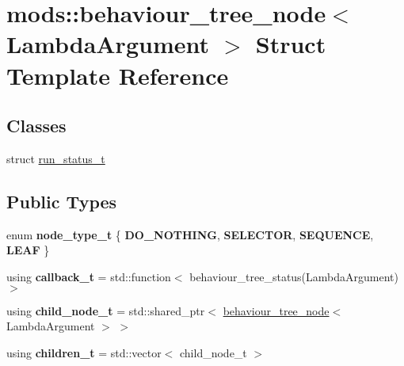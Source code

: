 \hypertarget{structmods_1_1behaviour__tree__node}{}\section{mods\+:\+:behaviour\+\_\+tree\+\_\+node$<$ Lambda\+Argument $>$ Struct Template Reference}
\label{structmods_1_1behaviour__tree__node}
\subsection*{Classes}
\begin{DoxyCompactItemize}
\item 
struct \hyperlink{structmods_1_1behaviour__tree__node_1_1run__status__t}{run\+\_\+status\+\_\+t}
\end{DoxyCompactItemize}
\subsection*{Public Types}
\begin{DoxyCompactItemize}
\item 
\mbox{\label{structmods_1_1behaviour__tree__node_a6d55cd288e1de6615791fc2fd2b7886f}} 
enum {\bfseries node\+\_\+type\+\_\+t} \{ {\bfseries D\+O\+\_\+\+N\+O\+T\+H\+I\+NG}, 
{\bfseries S\+E\+L\+E\+C\+T\+OR}, 
{\bfseries S\+E\+Q\+U\+E\+N\+CE}, 
{\bfseries L\+E\+AF}
 \}
\item 
\mbox{\label{structmods_1_1behaviour__tree__node_ae2bae54e8cee0794f1d06e819860ed63}} 
using {\bfseries callback\+\_\+t} = std\+::function$<$ behaviour\+\_\+tree\+\_\+status(Lambda\+Argument)$>$
\item 
\mbox{\label{structmods_1_1behaviour__tree__node_af209cd848ac105fdff22f3acc0b840cd}} 
using {\bfseries child\+\_\+node\+\_\+t} = std\+::shared\+\_\+ptr$<$ \hyperlink{structmods_1_1behaviour__tree__node}{behaviour\+\_\+tree\+\_\+node}$<$ Lambda\+Argument $>$ $>$
\item 
\mbox{\label{structmods_1_1behaviour__tree__node_a21514f2d396c22113a67577e88f7f883}} 
using {\bfseries children\+\_\+t} = std\+::vector$<$ child\+\_\+node\+\_\+t $>$
\end{DoxyCompactItemize}
